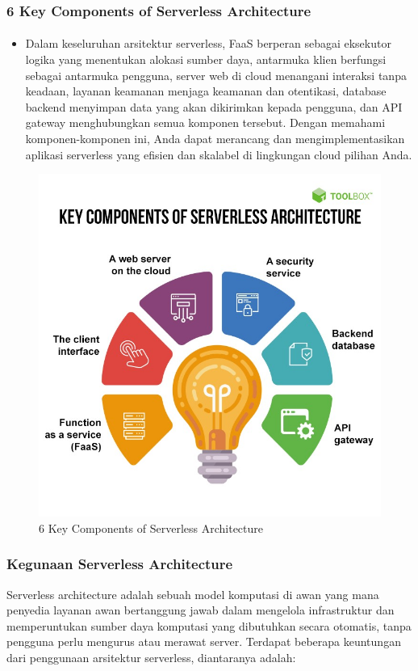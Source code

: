 \documentclass[aspectratio=169, table]{beamer}
\begin{document}
	\begin{frame}\frametitle{6 Key Components of Serverless Architecture}
		\framesubtitle{\hspace{1cm}}
		\begin{itemize}
			\item Dalam keseluruhan arsitektur serverless, FaaS berperan sebagai eksekutor logika yang menentukan alokasi sumber daya, antarmuka klien berfungsi sebagai antarmuka pengguna, server web di cloud menangani interaksi tanpa keadaan, layanan keamanan menjaga keamanan dan otentikasi, database backend menyimpan data yang akan dikirimkan kepada pengguna, dan API gateway menghubungkan semua komponen tersebut.
			Dengan memahami komponen-komponen ini, Anda dapat merancang dan mengimplementasikan aplikasi serverless yang efisien dan skalabel di lingkungan cloud pilihan Anda.
		\end{itemize}
	\end{frame}
	\begin{frame}
		\begin{figure}
			\includegraphics[width=0.5\linewidth]{komponen.jpg}
			\centering
			\caption{6 Key Components of Serverless Architecture}
		\end{figure}
	\end{frame}

	\begin{frame}\frametitle{Kegunaan Serverless Architecture}
		Serverless architecture adalah sebuah model komputasi di awan yang mana penyedia layanan awan bertanggung jawab dalam mengelola infrastruktur dan memperuntukan sumber daya komputasi yang dibutuhkan secara otomatis, tanpa pengguna perlu mengurus atau merawat server. Terdapat beberapa keuntungan dari penggunaan arsitektur serverless, diantaranya adalah:

	\end{frame}
\end{document}
